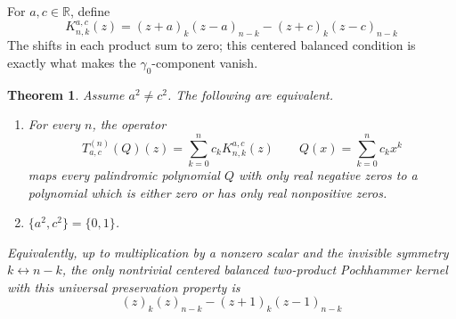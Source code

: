 \documentclass[a4paper,11pt,reqno]{amsart}
\numberwithin{equation}{section}
\newtheorem{theorem}{Theorem}
\theoremstyle{remark}
\begin{document}
For \(a,c\in\mathbb R\), define
\[
  K_{n,k}^{a,c}(z)
  =
  (z+a)_k(z-a)_{n-k}
  -
  (z+c)_k(z-c)_{n-k}
\]
The shifts in each product sum to zero; this centered balanced condition is exactly what makes the \(\gamma_0\)-component vanish.

\begin{theorem}\label{thm:classification}
Assume \(a^2\neq c^2\). The following are equivalent.
\begin{enumerate}
\item For every \(n\), the operator
\[
  T_{a,c}^{(n)}(Q)(z)
  =
  \sum_{k=0}^{n}c_kK_{n,k}^{a,c}(z)
  \qquad
  Q(x)=\sum_{k=0}^{n}c_kx^k
\]
maps every palindromic polynomial \(Q\) with only real negative zeros to a polynomial which is either zero or has only real nonpositive zeros.
\item \(\{a^2,c^2\}=\{0,1\}\).
\end{enumerate}
Equivalently, up to multiplication by a nonzero scalar and the invisible symmetry \(k\leftrightarrow n-k\), the only nontrivial centered balanced two-product Pochhammer kernel with this universal preservation property is
\[
  (z)_k(z)_{n-k}-(z+1)_k(z-1)_{n-k}
\]
\end{theorem}
\end{document}

